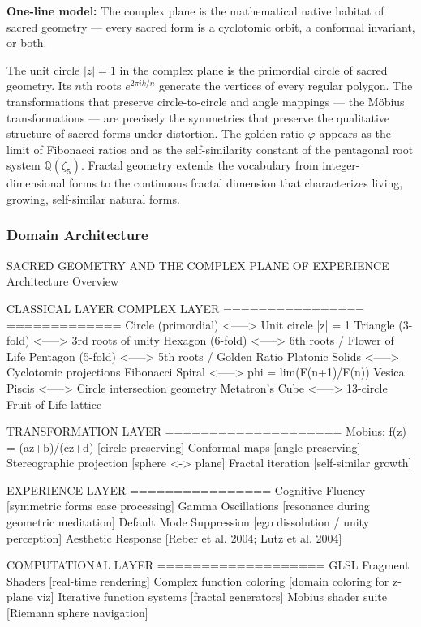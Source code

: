 \documentclass[11pt,letterpaper]{article}
\begin{document}
\textbf{One-line model:} The complex plane is the mathematical native habitat of sacred geometry --- every sacred form is a cyclotomic orbit, a conformal invariant, or both.

The unit circle $|z| = 1$ in the complex plane is the primordial circle of sacred geometry. Its $n$th roots $e^{2\pi i k/n}$ generate the vertices of every regular polygon. The transformations that preserve circle-to-circle and angle mappings --- the M\"{o}bius transformations --- are precisely the symmetries that preserve the qualitative structure of sacred forms under distortion. The golden ratio $\varphi$ appears as the limit of Fibonacci ratios and as the self-similarity constant of the pentagonal root system $\mathbb{Q}(\zeta_5)$. Fractal geometry extends the vocabulary from integer-dimensional forms to the continuous fractal dimension that characterizes living, growing, self-similar natural forms.

\subsubsection{Domain Architecture}

\begin{asciibox}
SACRED GEOMETRY AND THE COMPLEX PLANE OF EXPERIENCE
Architecture Overview

  CLASSICAL LAYER                  COMPLEX LAYER
  ================                 =============
  Circle (primordial)    <----->   Unit circle |z| = 1
  Triangle (3-fold)      <----->   3rd roots of unity
  Hexagon (6-fold)       <----->   6th roots / Flower of Life
  Pentagon (5-fold)      <----->   5th roots / Golden Ratio
  Platonic Solids        <----->   Cyclotomic projections
  Fibonacci Spiral       <----->   phi = lim(F(n+1)/F(n))
  Vesica Piscis          <----->   Circle intersection geometry
  Metatron's Cube        <----->   13-circle Fruit of Life lattice

  TRANSFORMATION LAYER
  ====================
  Mobius: f(z) = (az+b)/(cz+d)    [circle-preserving]
  Conformal maps                    [angle-preserving]
  Stereographic projection          [sphere <-> plane]
  Fractal iteration                 [self-similar growth]

  EXPERIENCE LAYER
  ================
  Cognitive Fluency          [symmetric forms ease processing]
  Gamma Oscillations         [resonance during geometric meditation]
  Default Mode Suppression   [ego dissolution / unity perception]
  Aesthetic Response         [Reber et al. 2004; Lutz et al. 2004]

  COMPUTATIONAL LAYER
  ===================
  GLSL Fragment Shaders      [real-time rendering]
  Complex function coloring  [domain coloring for z-plane viz]
  Iterative function systems [fractal generators]
  Mobius shader suite        [Riemann sphere navigation]
\end{asciibox}
\end{document}
